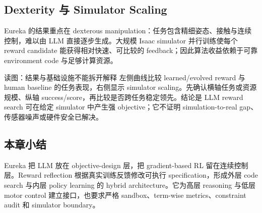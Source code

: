 \subsection{Dexterity 与 Simulator Scaling}

Eureka 的结果重点在 dexterous manipulation：任务包含精细姿态、接触与连续控制，难以由 LLM 直接逐步生成。大规模 Isaac simulator 并行训练使每个 reward candidate 能获得相对快速、可比较的 feedback；因此算法收益依赖于可靠 environment code 与足够计算资源。


\begin{knowledgebox}{读图：结果与基础设施不能拆开解释}
左侧曲线比较 learned/evolved reward 与 human baseline 的任务表现，右侧显示 simulator scaling。先确认横轴任务或资源规模、纵轴 success/score，再比较是否跨任务稳定领先。结论是 LLM reward search 可在给定 simulator 中产生强 objective；它不证明 simulation-to-real gap、传感器噪声或硬件安全已解决。
\end{knowledgebox}


\subsection{本章小结}

Eureka 把 LLM 放在 objective-design 层，把 gradient-based RL 留在连续控制层。Reward reflection 根据真实训练反馈修改可执行 specification，形成外层 code search 与内层 policy learning 的 hybrid architecture。它为高层 reasoning 与低层 motor control 建立接口，也要求严格 sandbox、term-wise metrics、constraint audit 和 simulator boundary。

